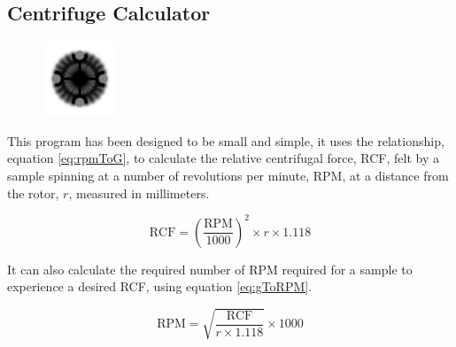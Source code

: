 \documentclass[a4paper]{article}
\begin{document}
	\pagestyle{fancy}
	\renewcommand{\headrulewidth}{0pt}
	\renewcommand{\footrulewidth}{0.4pt}
	\renewcommand{\subsectionmark}[1]{}
	\renewcommand{\sectionmark}[1]{\markboth{#1}{}}
	\rfoot{\thepage}
	\doublespacing

	\begin{centering}
 		\section*{Centrifuge Calculator}
 		\label{sec:centrifuge_calculator}
	\end{centering} 	

		\begin{figure}[ht!]
			\centering
			\includegraphics[height=6em]{Graphics/CentrifugeIcon}
		\end{figure}

		\noindent This program has been designed to be small and simple, it uses the relationship, equation \ref{eq:rpmToG}, to calculate the relative centrifugal force, RCF, felt by a sample spinning at a number of revolutions per minute, RPM, at a distance from the rotor, $r$, measured in millimeters.

		\begin{equation}
			\text{RCF} = \left( \frac{\text{RPM}}{1000} \right) ^{2} \times r \times 1.118
			\label{eq:rpmToG}
		\end{equation}

		\noindent It can also calculate the required number of RPM required for a sample to experience a desired RCF, using equation \ref{eq:gToRPM}.

		\begin{equation}
			\text{RPM} = \sqrt{\frac{\text{RCF}}{r \times 1.118}} \times 1000
			\label{eq:gToRPM}
		\end{equation}
\end{document}
